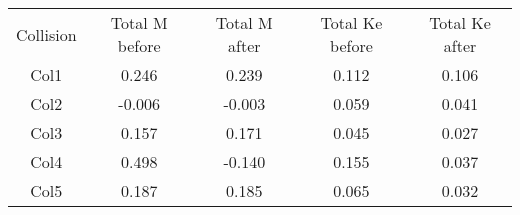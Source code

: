 \begin{table}[]
	\begin{tabular}{ccccc}
		Collision & Total M before & Total M after & Total Ke before & Total Ke after \\
		Col1      & 0.246          & 0.239         & 0.112           & 0.106          \\
		Col2      & -0.006         & -0.003        & 0.059           & 0.041          \\
		Col3      & 0.157          & 0.171         & 0.045           & 0.027          \\
		Col4      & 0.498          & -0.140        & 0.155           & 0.037          \\
		Col5      & 0.187          & 0.185         & 0.065           & 0.032
	\end{tabular}
\end{table}